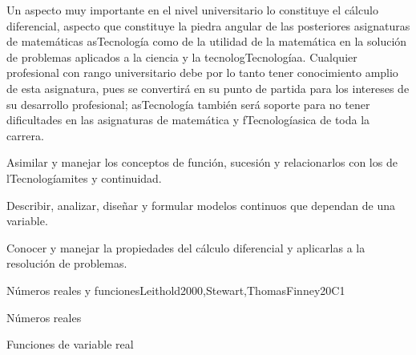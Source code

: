\begin{syllabus}


\begin{justification}
Un aspecto muy importante en el nivel universitario lo constituye el cálculo diferencial,  aspecto que constituye la piedra angular de las posteriores asignaturas de matemáticas asTecnología como de la utilidad de la matemática en la solución de problemas aplicados a la ciencia y la tecnologTecnologíaa. Cualquier profesional con rango universitario debe por lo tanto tener conocimiento amplio de esta asignatura, pues se convertirá en su punto de partida para los intereses de su desarrollo profesional; asTecnología también será soporte para no tener dificultades en las asignaturas de matemática y fTecnologíasica de toda la carrera.
\end{justification}

\begin{goals}
\item Asimilar y manejar los conceptos de función, sucesión y relacionarlos con los de lTecnologíamites y continuidad.
\item Describir, analizar, diseñar y formular modelos continuos que dependan de una variable.
\item Conocer y manejar la propiedades del cálculo diferencial y aplicarlas a la resolución de problemas.
\end{goals}

\begin{outcomes}
    \item {}
    \item {}
\end{outcomes}

\begin{competences}
    \item {}
    \item {}
    \item {}
\end{competences}

\begin{unit}{}{Números reales y funciones}{Leithold2000,Stewart,ThomasFinney}{20}{C1}
   \begin{topics}
      \item Números reales
      \item Funciones de variable real
   \end{topics}


\end{unit}
\end{syllabus}
